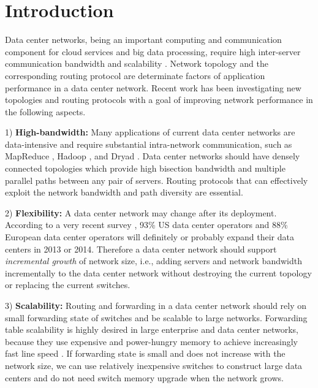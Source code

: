 \documentclass[10pt,conference]{IEEEtran}
\begin{document}
\newtheorem{mydef}{theorem}

\section{Introduction}  \label{sec:intro}

Data center networks, being an important computing and communication component for cloud services and big data processing, require high inter-server communication bandwidth and scalability \cite{DCN-survey}. Network topology and the corresponding routing protocol are determinate factors of application performance in a data center network. Recent work has been investigating new topologies and routing protocols with a goal of improving network performance in the following aspects.

1) \textbf{High-bandwidth:} Many applications of current data center networks are data-intensive and require
substantial intra-network communication, such as MapReduce \cite{mapreduce}, Hadoop \cite{hadoop}, and Dryad \cite{Dryad}. Data center networks should have densely connected topologies which provide high bisection bandwidth and multiple parallel paths between any pair of servers.  Routing protocols that can effectively exploit the network bandwidth and path diversity are essential.

2) \textbf{Flexibility:} A data center network may change after its deployment. According to a very recent survey \cite{DigitalRealty}, 93\% US data center operators and 88\% European data center operators will definitely or probably expand their data centers in 2013 or 2014. Therefore a data center network should support \emph{incremental growth} of network size, i.e., adding servers and network bandwidth incrementally to the data center network without destroying the current topology or replacing the current switches.

3) \textbf{Scalability:} Routing and forwarding in a data center network should rely on small forwarding state of switches and be scalable to large networks. Forwarding table scalability is highly desired in large enterprise and data center networks, because they use expensive and power-hungry memory to achieve increasingly fast line speed \cite{BUFFALO} \cite{SWDC} \cite{ROME}. If forwarding state is small and does not increase with the network size, we can use relatively inexpensive switches to construct large data centers and do not need switch memory upgrade when the network grows.
\end{document}
